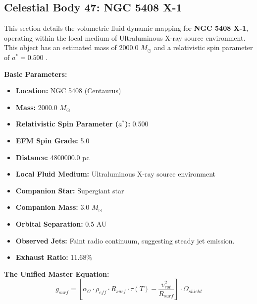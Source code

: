 \documentclass[11pt, a4paper]{article}
\begin{document}
\clearpage
\subsection{Celestial Body 47: NGC 5408 X-1}
This section details the volumetric fluid-dynamic mapping for \textbf{NGC 5408 X-1}, operating within the local medium of Ultraluminous X-ray source environment. This object has an estimated mass of 2000.0 $M_{\odot}$ and a relativistic spin parameter of $a^* = 0.500$ \cite{strohmayer2009, ned}.

\vspace{0.5em}
\noindent \textbf{Basic Parameters:}
\begin{itemize}
  \item \textbf{Location:} NGC 5408 (Centaurus)
  \item \textbf{Mass:} 2000.0 $M_{\odot}$
  \item \textbf{Relativistic Spin Parameter ($a^*$):} 0.500
  \item \textbf{EFM Spin Grade:} 5.0
  \item \textbf{Distance:} 4800000.0 pc
  \item \textbf{Local Fluid Medium:} Ultraluminous X-ray source environment
  \item \textbf{Companion Star:} Supergiant star
  \item \textbf{Companion Mass:} 3.0 $M_{\odot}$
  \item \textbf{Orbital Separation:} 0.5 AU
  \item \textbf{Observed Jets:} Faint radio continuum, suggesting steady jet emission.
  \item \textbf{Exhaust Ratio:} 11.68\%
\end{itemize}

\vspace{0.5em}
\noindent \textbf{The Unified Master Equation:}
$$ g_{surf} = \left[ \alpha_G \cdot \rho_{eff} \cdot R_{surf} \cdot \tau(T) - \frac{v_{rot}^2}{R_{surf}} \right] \cdot \Omega_{shield} $$
\end{document}
